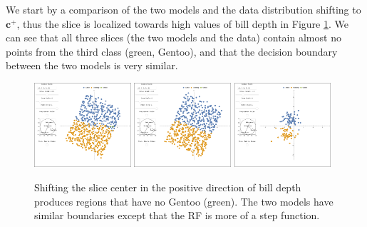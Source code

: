 \documentclass[]{interact}
\theoremstyle{plain}%
\theoremstyle{definition}
\theoremstyle{remark}
\begin{document}
We start by a comparison of the two models and the data distribution
shifting to \(\mathbf{c}^{+}\), thus the slice is localized towards high
values of bill depth in Figure \ref{slice1p}. We can see that all three
slices (the two models and the data) contain almost no points from the
third class (green, Gentoo), and that the decision boundary between the
two models is very similar.

\begin{figure}[ht]
\centerline{\includegraphics[width=0.32\textwidth]{figures/slice1_p_rf.png}
\includegraphics[width=0.32\textwidth]{figures/slice1_p_lda.png}
\includegraphics[width=0.32\textwidth]{figures/slice1_p_data.png}}
\caption{Shifting the slice center in the positive direction of bill depth produces regions that have no Gentoo (green). The two models have similar boundaries except that the RF is more of a step function.}
\label{slice1p}
\end{figure}
\end{document}
